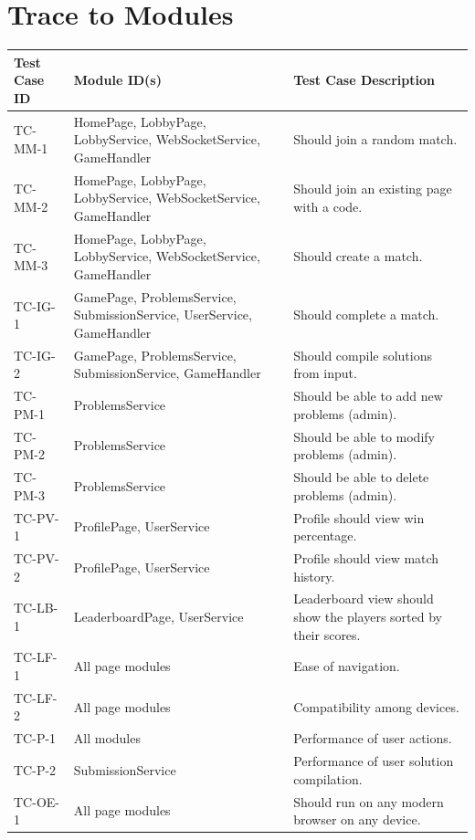 \documentclass[12pt, titlepage]{article}
\begin{document}
\section{Trace to Modules}
\begin{longtable}{| p{2.5cm} | p{5cm} | p{6cm}| }
    \hline
    Test Case ID & Module ID(s) & Test Case Description\\
    \hline
    TC-MM-1 & HomePage, LobbyPage, LobbyService, WebSocketService, GameHandler & Should join a random match.\\
    \hline
    TC-MM-2 &  HomePage, LobbyPage, LobbyService, WebSocketService, GameHandler & Should join an existing page with a code. \\
     \hline
    TC-MM-3 &  HomePage, LobbyPage, LobbyService, WebSocketService, GameHandler & Should create a match. \\
     \hline
    TC-IG-1 & GamePage, ProblemsService, SubmissionService, UserService, GameHandler & Should complete a match. \\
     \hline
    TC-IG-2 & GamePage, ProblemsService, SubmissionService, GameHandler & Should compile solutions from input.\\
     \hline
    TC-PM-1 & ProblemsService & Should be able to add new problems (admin).\\
     \hline
    TC-PM-2 & ProblemsService & Should be able to modify problems (admin).\\
     \hline
    TC-PM-3 & ProblemsService & Should be able to delete problems (admin).\\
     \hline
    TC-PV-1 & ProfilePage, UserService & Profile should view win percentage.\\
     \hline
    TC-PV-2 &  ProfilePage, UserService & Profile should view match history.\\
     \hline
    TC-LB-1 & LeaderboardPage, UserService & Leaderboard view should show the players sorted by their scores.\\
     \hline
    TC-LF-1 & All page modules & Ease of navigation.\\
    \hline
    TC-LF-2 & All page modules  & Compatibility among devices.\\
    \hline
     TC-P-1 & All modules & Performance of user actions.\\
    \hline
    TC-P-2 & SubmissionService & Performance of user solution compilation.\\
     \hline
    TC-OE-1 & All page modules & Should run on any modern browser on any device. \\

\end{longtable}
\end{document}
